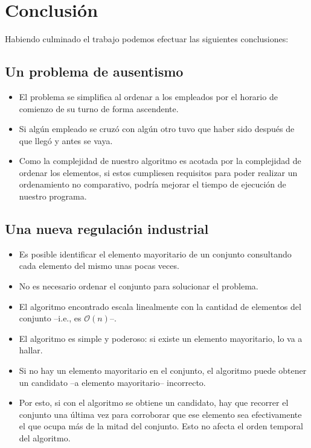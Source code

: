 \section{Conclusión}
Habiendo culminado el trabajo podemos efectuar las siguientes conclusiones:
 \subsection{Un problema de ausentismo}    
\begin{itemize}
    \item El problema se simplifica al ordenar a los empleados por el horario de comienzo de su turno de forma ascendente.
    \item Si algún empleado se cruzó con algún otro tuvo que haber sido después de que llegó y antes se vaya.
    \item Como la complejidad de nuestro algoritmo es acotada por la complejidad de ordenar los elementos, si estos cumpliesen requisitos para poder realizar un ordenamiento no comparativo, podría mejorar el tiempo de ejecución de nuestro programa. 
    
\end{itemize}
 \subsection{Una nueva regulación industrial}    
\begin{itemize}
    \item Es posible identificar el elemento mayoritario de un conjunto consultando cada elemento del mismo unas pocas veces.
    \item No es necesario ordenar el conjunto para solucionar el problema.
    \item El algoritmo encontrado escala linealmente con la cantidad de elementos del conjunto --i.e., es $\mathcal{O}(n)$--.
    \item El algoritmo es simple y poderoso: si existe un elemento mayoritario, lo va a hallar. 
    \item Si no hay un elemento mayoritario en el conjunto, el algoritmo puede obtener un candidato --a elemento mayoritario-- incorrecto. 
    \item Por esto, si con el algoritmo se obtiene un candidato, hay que recorrer el conjunto una última vez para corroborar que ese elemento sea efectivamente el que ocupa más de la mitad del conjunto. Esto no afecta el orden temporal del algoritmo.
\end{itemize}
